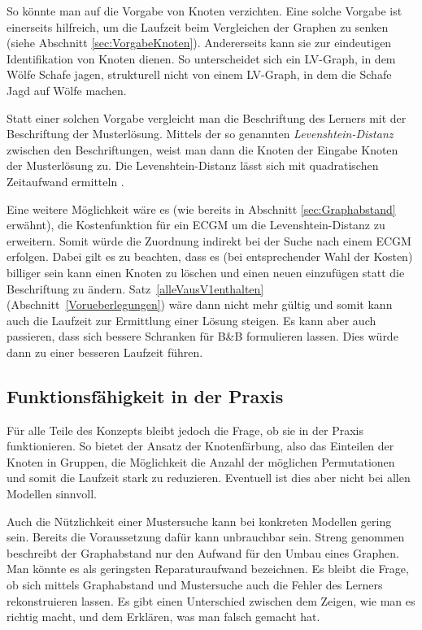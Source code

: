 So könnte man auf die Vorgabe von Knoten verzichten. Eine solche Vorgabe 
ist einerseits hilfreich, um die Laufzeit beim Vergleichen der Graphen zu 
senken (siehe Abschnitt \ref{sec:VorgabeKnoten}). Andererseits kann sie zur eindeutigen 
Identifikation von Knoten dienen. So unterscheidet sich ein LV-Graph, in dem 
Wölfe Schafe jagen, strukturell nicht von einem LV-Graph, in dem die Schafe 
Jagd auf Wölfe machen.

Statt einer solchen Vorgabe 
vergleicht man die Beschriftung des Lerners mit der Beschriftung der 
Musterlösung. Mittels der so genannten \emph{Levenshtein-Distanz} zwischen 
den Beschriftungen, weist man dann die Knoten der Eingabe Knoten der 
Musterlösung zu. Die Levenshtein-Distanz lässt sich mit quadratischen 
Zeitaufwand ermitteln \cite{wikiD:LevDis}.

Eine weitere Möglichkeit wäre es (wie bereits in Abschnitt \ref{sec:Graphabstand} 
erwähnt), die Kostenfunktion für ein ECGM um die Levenshtein-Distanz zu 
erweitern. Somit würde die Zuordnung indirekt bei der Suche nach einem 
ECGM erfolgen. Dabei gilt es zu beachten, dass es (bei entsprechender 
Wahl der Kosten) billiger sein kann einen Knoten zu löschen und einen 
neuen einzufügen statt die Beschriftung zu ändern. Satz~\ref{alleVausV1enthalten} 
(Abschnitt~\ref{Vorueberlegungen}) wäre dann nicht mehr gültig und somit 
kann auch die Laufzeit zur Ermittlung einer Lösung steigen. Es kann aber 
auch passieren, dass sich bessere Schranken für B\&B formulieren lassen. 
Dies würde dann zu einer besseren Laufzeit führen.

\subsection{Funktionsfähigkeit in der Praxis}
Für alle Teile des Konzepts bleibt jedoch die Frage, ob sie in der Praxis 
funktionieren. So bietet der Ansatz der Knotenfärbung, also das Einteilen 
der Knoten in Gruppen, die Möglichkeit die Anzahl der möglichen 
Permutationen und somit die Laufzeit stark zu reduzieren. Eventuell ist 
dies aber nicht bei allen Modellen sinnvoll.

Auch die Nützlichkeit einer Mustersuche kann bei konkreten Modellen 
gering sein. Bereits die Voraussetzung dafür kann unbrauchbar sein. 
Streng genommen beschreibt der Graphabstand nur den Aufwand für den Umbau 
eines Graphen. Man könnte es als geringsten Reparaturaufwand bezeichnen. 
Es bleibt die Frage, ob sich mittels Graphabstand und Mustersuche auch 
die Fehler des Lerners rekonstruieren lassen. Es gibt einen Unterschied 
zwischen dem Zeigen, wie man es richtig macht, und dem Erklären, was man 
falsch gemacht hat.


